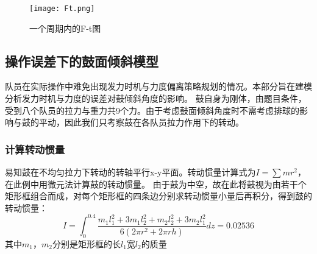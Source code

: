\documentclass[withoutpreface,bwprint]{cumcmthesis} %
\begin{document}
\begin{figure}
	\centering
	\texttt{[image: Ft.png]}
	\caption{一个周期内的F-t图}
	\label{fig:Ft} %
\end{figure}

\subsection{操作误差下的鼓面倾斜模型}
队员在实际操作中难免出现发力时机与力度偏离策略规划的情况。本部分旨在建模分析发力时机与力度的误差对鼓倾斜角度的影响。
鼓自身为刚体，由题目条件，受到八个队员的拉力与重力共9个力。由于考虑鼓面倾斜角度时不需考虑排球的影响与鼓的平动，因此我们只考察鼓在各队员拉力作用下的转动。

\subsubsection{计算转动惯量}
易知鼓在不均匀拉力下转动的转轴平行x-y平面。转动惯量计算式为$I=\sum mr^2$，在此例中用微元法计算鼓的转动惯量。
由于鼓为中空，故在此将鼓视为由若干个矩形框组合而成，对每个矩形框的四条边分别求转动惯量小量后再积分，得到鼓的转动惯量：
$$I=\int_{0}^{0.4} \frac{m_{1}l_{1}^{2}+3m_{1}l_{2}^{2}+m_{2}l_{2}^{2}+3m_{2} l_{1}^{2}}{6(2\pi r^{2}+ 2\pi rh)}dz=0.02536$$
其中$m_1$，$m_2$分别是矩形框的长$l_1$宽$l_2$的质量
\end{document}
